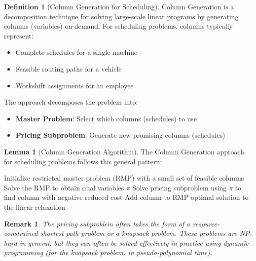 \documentclass{article}
\newtheorem{remark}{Remark}
\theoremstyle{definition}
\newtheorem{lemma}{Lemma}
\newtheorem{definition}{Definition}
\begin{document}
\begin{definition}[Column Generation for Scheduling]
Column Generation is a decomposition technique for solving large-scale linear programs by generating columns (variables) on-demand. For scheduling problems, columns typically represent:
\begin{itemize}
    \item Complete schedules for a single machine
    \item Feasible routing paths for a vehicle
    \item Workshift assignments for an employee
\end{itemize}

The approach decomposes the problem into:
\begin{itemize}
    \item \textbf{Master Problem}: Select which columns (schedules) to use
    \item \textbf{Pricing Subproblem}: Generate new promising columns (schedules)
\end{itemize}
\end{definition}

\begin{lemma}[Column Generation Algorithm]
The Column Generation approach for scheduling problems follows this general pattern:

\begin{algorithm}
\caption{Column Generation for Scheduling}
\begin{algorithmic}[1]
    \State Initialize restricted master problem (RMP) with a small set of feasible columns
    \Repeat
        \State Solve the RMP to obtain dual variables $\pi$
            \State Solve pricing subproblem using $\pi$ to find column with negative reduced cost
                \State Add column to RMP
            \EndIf
        \EndFor
    \State \Return optimal solution to the linear relaxation
\EndProcedure
\end{algorithmic}
\end{algorithm}

\begin{remark}
The pricing subproblem often takes the form of a resource-constrained shortest path problem or a knapsack problem. These problems are NP-hard in general, but they can often be solved effectively in practice using dynamic programming (for the knapsack problem, in pseudo-polynomial time).
\end{remark}
\end{lemma}
\end{document}
